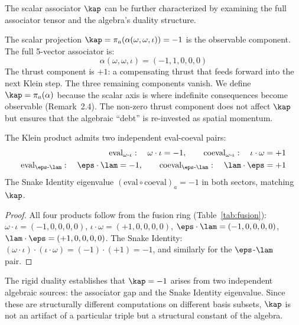 The scalar associator $\kap$ can be further characterized by examining the full associator tensor and the algebra's duality structure.

\begin{remark}
The scalar projection $\kap = \pi_a(\alpha(\omega, \omega, \iota)) = -1$ is the observable component. The full 5-vector associator is:
$$\alpha(\omega, \omega, \iota) = (-1, 1, 0, 0, 0)$$
The thrust component is $+1$: a compensating thrust that feeds forward into the next Klein step. The three remaining components vanish. We define $\kap = \pi_a(\alpha)$ because the scalar axis is where indefinite consequences become observable (Remark~2.4). The non-zero thrust component does not affect $\kap$ but ensures that the algebraic ``debt'' is re-invested as spatial momentum.
\end{remark}

\begin{theorem}\label{thm:rigidity}
The Klein product admits two independent eval-coeval pairs:
\begin{align}
\mathrm{eval}_{\omega\text{-}\iota}: \quad \omega \cdot \iota = -1, \qquad
\mathrm{coeval}_{\omega\text{-}\iota}: \quad \iota \cdot \omega = +1 \\
\mathrm{eval}_{\eps\text{-}\lam}: \quad \eps \cdot \lam = -1, \qquad
\mathrm{coeval}_{\eps\text{-}\lam}: \quad \lam \cdot \eps = +1
\end{align}
The Snake Identity eigenvalue $(\mathrm{eval} \circ \mathrm{coeval})_a = -1$ in both sectors, matching $\kap$.
\end{theorem}

\begin{proof}
All four products follow from the fusion ring (Table~\ref{tab:fusion}): $\omega \cdot \iota = (-1,0,0,0,0)$, $\iota \cdot \omega = (+1,0,0,0,0)$, $\eps \cdot \lam = (-1,0,0,0,0)$, $\lam \cdot \eps = (+1,0,0,0,0)$. The Snake Identity: $(\omega \cdot \iota) \cdot (\iota \cdot \omega) = (-1) \cdot (+1) = -1$, and similarly for the $\eps$-$\lam$ pair. \qedhere
\end{proof}

\begin{remark}
The rigid duality establishes that $\kap = -1$ arises from two independent algebraic sources: the associator gap and the Snake Identity eigenvalue. Since these are structurally different computations on different basis subsets, $\kap$ is not an artifact of a particular triple but a structural constant of the algebra.
\end{remark}

